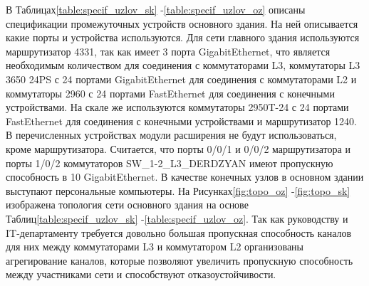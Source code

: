 В Таблицах\;\ref{table:specif_uzlov_sk} -\;\ref{table:specif_uzlov_oz} описаны спецификации промежуточных устройств основного здания. На ней описывается какие порты и устройства используются. Для сети главного здания используются маршрутизатор 4331, так как имеет 3 порта GigabitEthernet, что является необходимым количеством для соединения с коммутаторами L3, коммутаторы L3 3650 24PS с 24 портами GigabitEthernet для соединения с коммутаторами L2 и коммутаторы 2960 с 24 портами FastEthernet для соединения с конечными устройствами. На скале же используются коммутаторы 2950T-24 с 24 портами FastEthernet для соединения с конечными устройствами и маршрутизатор 1240. В перечисленных устройствах модули расширения не будут использоваться, кроме маршрутизатора. Считается, что порты 0/0/1 и 0/0/2 маршрутизатора и порты 1/0/2 коммутаторов SW\_1-2\_L3\_DERDZYAN имеют пропускную способность в 10 GigabitEthernet.  В качестве конечных узлов в основном здании выступают персональные компьютеры. На Рисунках\;\ref{fig:topo_oz} -\;\ref{fig:topo_sk} изображена топология сети основного здания на основе Таблиц\;\ref{table:specif_uzlov_sk} -\;\ref{table:specif_uzlov_oz}. Так как руководству и IT-департаменту требуется довольно большая пропускная способность каналов для них между коммутаторами L3 и коммутатором L2 организованы агрегирование каналов\cite{cisco-etherchannel}, которые позволяют увеличить пропускную способность между участниками сети и способствуют отказоустойчивости.



